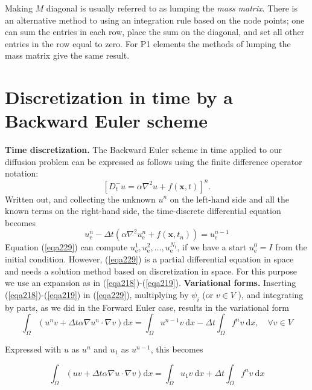 \documentclass[../main.tex]{subfiles}
\begin{document}
		Making $M$ diagonal is usually referred to as lumping the \emph{mass matrix}. There is an alternative method to using an integration rule based on the node points; one can sum the entries in each row, place the sum on the diagonal, and set all other entries in the row equal to zero. For P1 elements the methods of lumping the mass matrix give the same result.
	\section[Discretization in time by a Backward Euler scheme]{Discretization in time by a Backward Euler scheme}
		\label{sec:sec_19_7}
		\noindent \textbf{Time discretization.   } The Backward Euler scheme in time applied to our diffusion problem can be expressed as follows using the finite difference operator notation:
		$$
		\left[D_{t}^{-} u=\alpha \nabla^{2} u+f(\boldsymbol{x}, t)\right]^{n} .
		$$
		Written out, and collecting the unknown $u^{n}$ on the left-hand side and all the known terms on the right-hand side, the time-discrete differential equation becomes
		\begin{equation}
		\label{eqa229}	
			u_{\mathrm{e}}^{n}-\Delta t\left(\alpha \nabla^{2} u_{\mathrm{e}}^{n}+f\left(\boldsymbol{x}, t_{n}\right)\right)=u_{\mathrm{e}}^{n-1}
		\end{equation}
		Equation (\ref{eqa229}) can compute $u_{\mathrm{e}}^{1}, u_{\mathrm{e}}^{2}, \ldots, u_{\mathrm{e}}^{N_{t}}$, if we have a start $u_{\mathrm{e}}^{0}=I$ from the initial condition. However, (\ref{eqa229}) is a partial differential equation in space and needs a solution method based on discretization in space. For this purpose we use an expansion as in (\ref{eqa218})-(\ref{eqa219}).\bigbreak
		\noindent \textbf{Variational forms.   } Inserting (\ref{eqa218})-(\ref{eqa219}) in (\ref{eqa229}), multiplying by $\psi_{i}$ (or $v \in V$ ), and integrating by parts, as we did in the Forward Euler case, results in the variational form
		\begin{equation}
		\label{eqa230}	
			\int_{\Omega}\left(u^{n} v+\Delta t \alpha \nabla u^{n} \cdot \nabla v\right) \mathrm{d} x=\int_{\Omega} u^{n-1} v \mathrm{~d} x-\Delta t \int_{\Omega} f^{n} v \mathrm{~d} x, \quad \forall v \in V
		\end{equation}
	
		\noindent Expressed with $u$ as $u^{n}$ and $u_{1}$ as $u^{n-1}$, this becomes
	
		\begin{equation}
			\label{eqa231}	
			\int_{\Omega}(u v+\Delta t \alpha \nabla u \cdot \nabla v) \mathrm{d} x=\int_{\Omega} u_{1} v \mathrm{~d} x+\Delta t \int_{\Omega} f^{n} v \mathrm{~d} x
		\end{equation}
	
\end{document}
